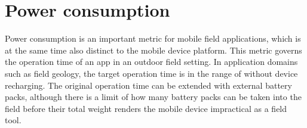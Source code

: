 \documentclass[review]{elsarticle}
\begin{document}
%


\section{Power consumption}
\label{sec:technology:power}

Power consumption is an important metric for mobile field applications, which is at the same time also distinct to the mobile device platform. This metric governs the operation time of an app in an outdoor field setting. In application domains such as field geology, the target operation time is in the range of  without device recharging. The original operation time can be extended with external battery packs, although there is a limit of how many battery packs can be taken into the field before their total weight renders the mobile device impractical as a field tool.
\end{document}
